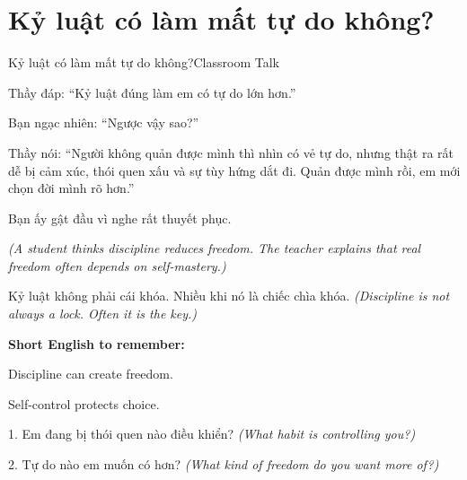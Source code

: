 \section{Kỷ luật có làm mất tự do không?}
\begin{truyen}{Kỷ luật có làm mất tự do không?}{Classroom Talk}

Thầy đáp: ``Kỷ luật đúng làm em có tự do lớn hơn.''

Bạn ngạc nhiên: ``Ngược vậy sao?''

Thầy nói: ``Người không quản được mình thì nhìn có vẻ tự do, nhưng thật ra rất dễ bị cảm xúc, thói quen xấu và sự tùy hứng dắt đi. Quản được mình rồi, em mới chọn đời mình rõ hơn.''

Bạn ấy gật đầu vì nghe rất thuyết phục.

\textit{(A student thinks discipline reduces freedom. The teacher explains that real freedom often depends on self-mastery.)}
\end{truyen}

\begin{baihoc}
Kỷ luật không phải cái khóa. Nhiều khi nó là chiếc chìa khóa.
\textit{(Discipline is not always a lock. Often it is the key.)}
\end{baihoc}

\begin{ghinhoanh}
\textbf{Short English to remember:}

Discipline can create freedom.

Self-control protects choice.
\end{ghinhoanh}

\begin{tuhocnhanh}
1. Em đang bị thói quen nào điều khiển? \textit{(What habit is controlling you?)}

2. Tự do nào em muốn có hơn? \textit{(What kind of freedom do you want more of?)}
\end{tuhocnhanh}
\ngancach